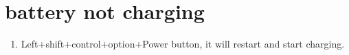 \documentclass[12pt]{article}
\begin{document}
\section{battery not charging}

\begin{enumerate}
   \item Left+shift+control+option+Power button, it will restart and start charging.
\end{enumerate}
\end{document}
